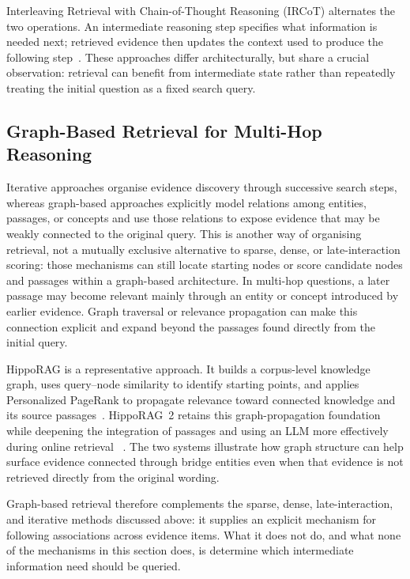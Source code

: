 Interleaving Retrieval with Chain-of-Thought Reasoning (IRCoT) alternates the two
operations. An intermediate
reasoning step specifies what information is needed next; retrieved evidence then
updates the context used to produce the following step~\cite{trivedi2023interleaving}.
These approaches differ architecturally, but share a crucial observation:
retrieval can benefit from intermediate state rather than repeatedly treating
the initial question as a fixed search query.

\subsection{Graph-Based Retrieval for Multi-Hop Reasoning}
\label{subsec:graph-retrieval}

Iterative approaches organise evidence discovery through successive search
steps, whereas graph-based approaches explicitly model relations among
entities, passages, or concepts and use those relations to expose evidence that
may be weakly connected to the original query. This is another way of
organising retrieval, not a mutually exclusive alternative to sparse, dense, or
late-interaction scoring: those mechanisms can still locate starting nodes or
score candidate nodes and passages within a graph-based architecture. In
multi-hop questions, a later passage may become relevant mainly through an
entity or concept introduced by earlier evidence. Graph traversal or relevance
propagation can make this connection explicit and expand beyond the passages
found directly from the initial query.

HippoRAG is a representative approach. It builds a corpus-level knowledge graph,
uses query--node similarity to identify starting points, and applies
Personalized PageRank to propagate relevance toward connected knowledge and its
source passages~\cite{gutierrez2024hipporag}. \mbox{HippoRAG~2} retains this
graph-propagation foundation while deepening the integration of passages and
using an LLM more effectively during online retrieval
~\cite{gutierrez2025hipporag2}. The two systems illustrate how graph structure
can help surface evidence connected through bridge entities even when that
evidence is not retrieved directly from the original wording.

Graph-based retrieval therefore complements the sparse, dense, late-interaction,
and iterative methods discussed above: it supplies an explicit mechanism for
following associations across evidence items. What it does not do, and what
none of the mechanisms in this section does, is determine which intermediate
information need should be queried.

